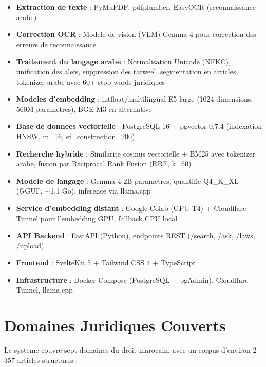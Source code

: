 \begin{itemize}
    \item \textbf{Extraction de texte} : PyMuPDF, pdfplumber, EasyOCR (reconnaissance arabe)
    \item \textbf{Correction OCR} : Modele de vision (VLM) Gemma 4 pour correction des erreurs de reconnaissance
    \item \textbf{Traitement du langage arabe} : Normalisation Unicode (NFKC), unification des alefs, suppression des tatweel, segmentation en articles, tokenizer arabe avec 60+ stop words juridiques
    \item \textbf{Modeles d'embedding} : intfloat/multilingual-E5-large (1024 dimensions, 560M parametres), BGE-M3 en alternative
    \item \textbf{Base de donnees vectorielle} : PostgreSQL 16 + pgvector 0.7.4 (indexation HNSW, m=16, ef\_construction=200)
    \item \textbf{Recherche hybride} : Similarite cosinus vectorielle + BM25 avec tokenizer arabe, fusion par Reciprocal Rank Fusion (RRF, k=60)
    \item \textbf{Modele de langage} : Gemma 4 2B parametres, quantifie Q4\_K\_XL (GGUF, $\sim$1.1 Go), inference via llama.cpp
    \item \textbf{Service d'embedding distant} : Google Colab (GPU T4) + Cloudflare Tunnel pour l'embedding GPU, fallback CPU local
    \item \textbf{API Backend} : FastAPI (Python), endpoints REST (/search, /ask, /laws, /upload)
    \item \textbf{Frontend} : SvelteKit 5 + Tailwind CSS 4 + TypeScript
    \item \textbf{Infrastructure} : Docker Compose (PostgreSQL + pgAdmin), Cloudflare Tunnel, llama.cpp
\end{itemize}

\section{Domaines Juridiques Couverts}

Le systeme couvre sept domaines du droit marocain, avec un corpus d'environ 2 357 articles structures :

